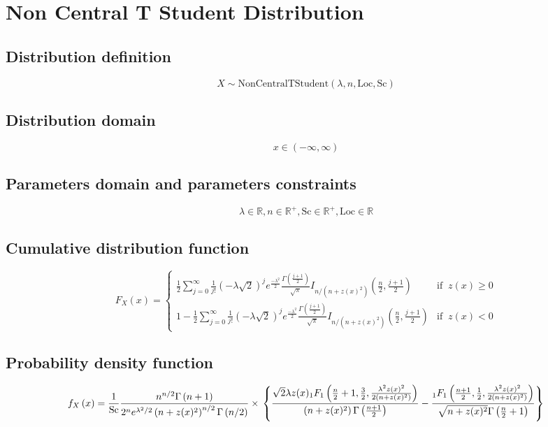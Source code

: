 \documentclass{article}
\begin{document}
\newpage
\section{Non Central T Student Distribution}
\subsection{Distribution definition}
\begin{equation*} X\sim\mathrm{NonCentralTStudent}\left(\lambda,n,\text{Loc},\text{Sc}\right) \end{equation*}
\subsection{Distribution domain}
\begin{equation*} x\in\left(-\infty,\infty\right) \end{equation*}
\subsection{Parameters domain and parameters constraints}
\begin{equation*} \lambda\in\mathbb{R}, n\in\mathbb{R}^{+}, \text{Sc}\in\mathbb{R}^{+}, \text{Loc}\in\mathbb{R} \end{equation*}
\subsection{Cumulative distribution function}
\begin{equation*} F_{X}\left(x\right)=\left\{\begin{array}{cl}\frac{1}{2}\sum_{j=0}^\infty\frac{1}{j!}(-\lambda\sqrt{2})^je^{\frac{-\lambda^2}{2}}\frac{\Gamma(\frac{j+1}{2})}{\sqrt{\pi}}I_{n/(n+z(x)^2)}\left (\frac{n}{2},\frac{j+1}{2}\right ) & \text{if } \ z(x)\ge 0 \\ 1-\frac{1}{2}\sum_{j=0}^\infty\frac{1}{j!}(-\lambda\sqrt{2})^je^{\frac{-\lambda^2}{2}}\frac{\Gamma(\frac{j+1}{2})}{\sqrt{\pi}}I_{n/(n+z(x)^2)}\left (\frac{n}{2},\frac{j+1}{2}\right ) & \text{if } \ z(x) < 0\end{array} \right. \end{equation*}
\subsection{Probability density function}
\begin{equation*} f_{X}\left(x\right)=\frac{1}{\text{Sc}}\frac{n^{n/2}\Gamma\left(n+1\right)}{2^{n}e^{\lambda^{2}/2}\left(n+z(x)^{2}\right)^{n/2}\Gamma\left(n/2\right)}\times \\ \left\{ \frac{\sqrt{2}\lambda z(x)_{1}F_{1}\left(\frac{n}{2}+1,\frac{3}{2},\frac{\lambda^{2}z(x)^{2}}{2\left(n+z(x)^{2}\right)}\right)}{\left(n+z(x)^{2}\right)\Gamma\left(\frac{n+1}{2}\right)} - \frac{_{1}F_{1}\left(\frac{n+1}{2},\frac{1}{2},\frac{\lambda^{2}z(x)^{2}}{2\left(n+z(x)^{2}\right)}\right)}{\sqrt{n+z(x)^{2}}\Gamma\left(\frac{n}{2}+1\right)} \right\} \end{equation*}
\end{document}
